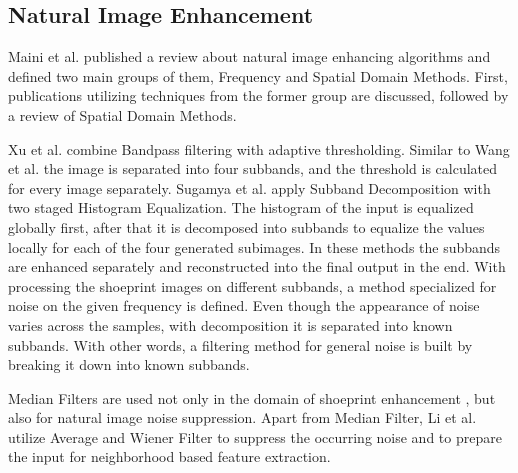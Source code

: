 \documentclass[draft,final]{vutinfth} %
\begin{document}


\subsection{Natural Image Enhancement}
\par
Maini et al. \cite{maini2010comprehensive} published a review about natural image enhancing algorithms and defined two main groups of them, Frequency and Spatial Domain Methods.
First, publications utilizing techniques from the former group are discussed, followed by a review of Spatial Domain Methods. 
\par
Xu et al. \cite{xu2016image} combine Bandpass filtering with adaptive thresholding.
Similar to Wang et al. \cite{wang2014enhanced} the image is separated into four subbands, and the threshold is calculated for every image separately.
Sugamya et al. \cite{sugamya2016image} apply Subband Decomposition with two staged Histogram Equalization.
The histogram of the input is equalized globally first, after that it is decomposed into subbands to equalize the values locally for each of the four generated subimages.
In these methods the subbands are enhanced separately and reconstructed into the final output in the end.
With processing the shoeprint images on different subbands, a method specialized for noise on the given frequency is defined.
Even though the appearance of noise varies across the samples, with decomposition it is separated into known subbands.
With other words, a filtering method for general noise is built by breaking it down into known subbands.  
\par
Median Filters are used not only in the domain of shoeprint enhancement \cite{alizadeh2017automatic}, but also for natural image noise suppression.
Apart from Median Filter, Li et al. \cite{li2014rapid} utilize Average and Wiener Filter to suppress the occurring noise and to prepare the input for neighborhood based feature extraction.
\end{document}
